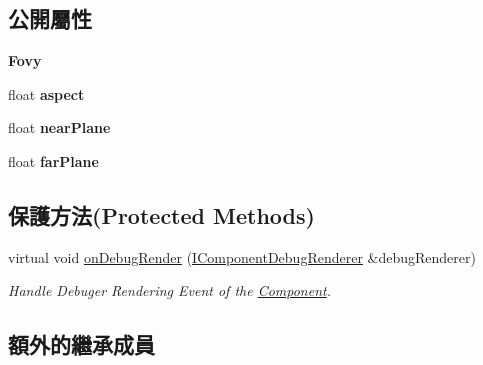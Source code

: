 \subsection*{公開屬性}
\begin{DoxyCompactItemize}
\item 
{\bfseries Fovy}\hypertarget{class_magnum_1_1_perspective_camera_component_add7ad722032bc2c028c0b44547bac1fb}{}\label{class_magnum_1_1_perspective_camera_component_add7ad722032bc2c028c0b44547bac1fb}

\item 
float {\bfseries aspect}
\item 
float {\bfseries near\+Plane}\hypertarget{class_magnum_1_1_perspective_camera_component_a8ff3fc991657ed8b2c436279fd12dafd}{}\label{class_magnum_1_1_perspective_camera_component_a8ff3fc991657ed8b2c436279fd12dafd}

\item 
float {\bfseries far\+Plane}\hypertarget{class_magnum_1_1_perspective_camera_component_ab6670e5653ddfc379facbd0c82746bad}{}\label{class_magnum_1_1_perspective_camera_component_ab6670e5653ddfc379facbd0c82746bad}

\end{DoxyCompactItemize}
\subsection*{保護方法(Protected Methods)}
\begin{DoxyCompactItemize}
\item 
virtual void \hyperlink{class_magnum_1_1_perspective_camera_component_a83b864b187b8b5244eb9d23eeef02b5c}{on\+Debug\+Render} (\hyperlink{class_magnum_1_1_i_component_debug_renderer}{I\+Component\+Debug\+Renderer} \&debug\+Renderer)\hypertarget{class_magnum_1_1_perspective_camera_component_a83b864b187b8b5244eb9d23eeef02b5c}{}\label{class_magnum_1_1_perspective_camera_component_a83b864b187b8b5244eb9d23eeef02b5c}

\begin{DoxyCompactList}\small\item\em Handle Debuger Rendering Event of the \hyperlink{class_magnum_1_1_component}{Component}. \end{DoxyCompactList}\end{DoxyCompactItemize}
\subsection*{額外的繼承成員}


